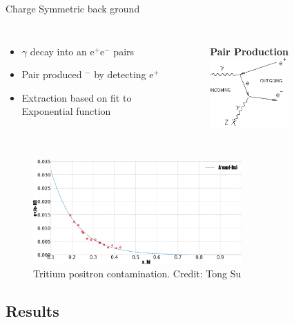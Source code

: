 \documentclass[12pt]{beamer}
\begin{document}
\begin{frame}{Charge Symmetric back ground}
\vspace{-0pt}

	\begin{columns}
		\vspace*{-0.75cm}
		\begin{itemize}
			\item $\gamma$ decay into an e$^+$e$^-$ pairs
			\item  Pair produced $^-$ by detecting e$^+$
			\item Extraction based on fit to Exponential function 
		\end{itemize}
		\vspace{-40pt}
		\begin{figure}
			\textbf{Pair Production}
			\includegraphics[width=3.0cm]{../images/pp_FD.png}
		\end{figure}
	\end{columns}
	

	\begin{figure}
			\caption*{Tritium positron contamination. Credit: Tong Su}
			\includegraphics[width=8.0cm]{../images/positron_H3_bane.pdf}
	\end{figure}
		

	

\end{frame}
\subsection[Results]{Results}
\end{document}
